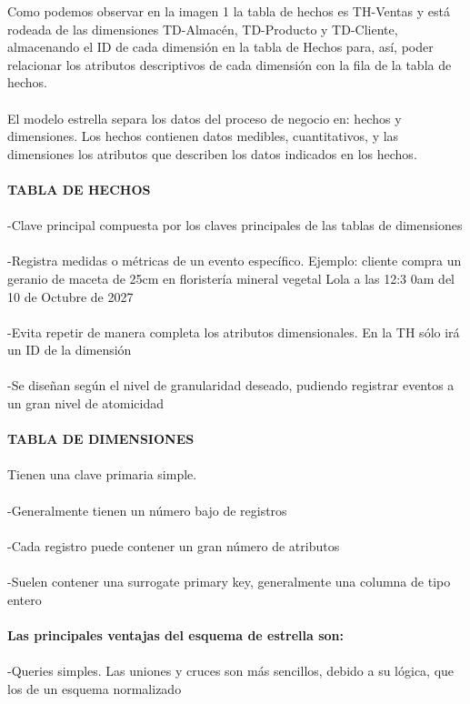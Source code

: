 Como podemos observar en la imagen 1 la tabla de hechos es TH-Ventas y está rodeada de las dimensiones TD-Almacén, TD-Producto y TD-Cliente, almacenando el ID de cada dimensión en la tabla de Hechos para, así, poder relacionar los atributos descriptivos de cada dimensión con la fila de la tabla de hechos.\\\\
El modelo estrella separa los datos del proceso de negocio en: hechos y dimensiones. Los hechos contienen datos medibles, cuantitativos, y las dimensiones los atributos que describen los datos indicados en los hechos.\\\\
\textbf{TABLA DE HECHOS}\\\\
-Clave principal compuesta por los claves principales de las tablas de dimensiones\\\\
-Registra medidas o métricas de un evento específico. Ejemplo: cliente compra un geranio de maceta de 25cm en floristería mineral vegetal Lola a las 12:3 0am del 10 de Octubre de 2027\\\\
-Evita repetir de manera completa los atributos dimensionales. En la TH sólo irá un ID de la dimensión\\\\
-Se diseñan según el nivel de granularidad deseado, pudiendo registrar eventos a un gran nivel de atomicidad\\\\
\textbf{TABLA DE DIMENSIONES}\\\\
Tienen una clave primaria simple.\\\\
-Generalmente tienen un número bajo de registros\\\\
-Cada registro puede contener un gran número de atributos\\\\
-Suelen contener una surrogate primary key, generalmente una columna de tipo entero\\\\
\textbf{Las principales ventajas del esquema de estrella son:}\\\\
-Queries simples. Las uniones y cruces son más sencillos, debido a su lógica, que los de un esquema normalizado\\\\
